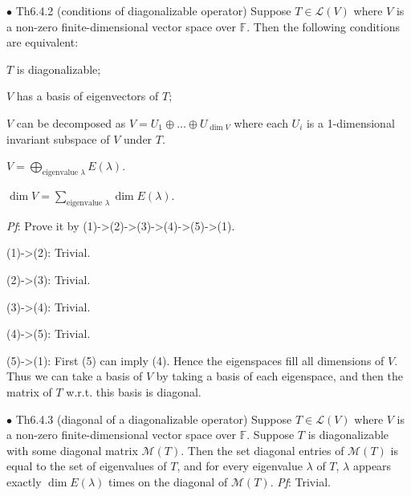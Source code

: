 \documentclass{article}
\begin{document}
\begin{Th}{$\bullet$ Th6.4.2 (conditions of diagonalizable operator)}
    Suppose $T\in\mathcal{L}(V)$ where $V$ is a non-zero finite-dimensional vector space over $\mathbb{F}$. Then the following conditions are equivalent:
    \begin{compactenum}
        \item $T$ is diagonalizable;
        \item $V$ has a basis of eigenvectors of $T$;
        \item $V$ can be decomposed as $V = U_1\oplus \dots \oplus U_{\dim V}$ where each $U_i$ is a 1-dimensional invariant subspace of $V$ under $T$.
        \item $V = \bigoplus_{\text{eigenvalue }\lambda} E(\lambda)$.
        \item $\dim V = \sum_{\text{eigenvalue }\lambda} \dim E(\lambda)$.
    \end{compactenum}
    \tcblower
    \textit{Pf}: Prove it by (1)->(2)->(3)->(4)->(5)->(1).
    \begin{compactitem}
        \item (1)->(2): Trivial.
        \item (2)->(3): Trivial.
        \item (3)->(4): Trivial.
        \item (4)->(5): Trivial.
        \item (5)->(1): First (5) can imply (4). Hence the eigenspaces fill all dimensions of $V$. Thus we can take a basis of $V$ by taking a basis of each eigenspace, and then the matrix of $T$ w.r.t. this basis is diagonal.
    \end{compactitem}
\end{Th}

\begin{Th}{$\bullet$ Th6.4.3 (diagonal of a diagonalizable operator)}
    Suppose $T\in\mathcal{L}(V)$ where $V$ is a non-zero finite-dimensional vector space over $\mathbb{F}$. Suppose $T$ is diagonalizable with some diagonal matrix $\mathcal{M}(T)$. Then the set diagonal entries of $\mathcal{M}(T)$ is equal to the set of eigenvalues of $T$, and for every eigenvalue $\lambda$ of $T$, $\lambda$ appears exactly $\dim E(\lambda)$ times on the diagonal of $\mathcal{M}(T)$.
    \tcblower
    \textit{Pf}: Trivial.
\end{Th}
\end{document}
